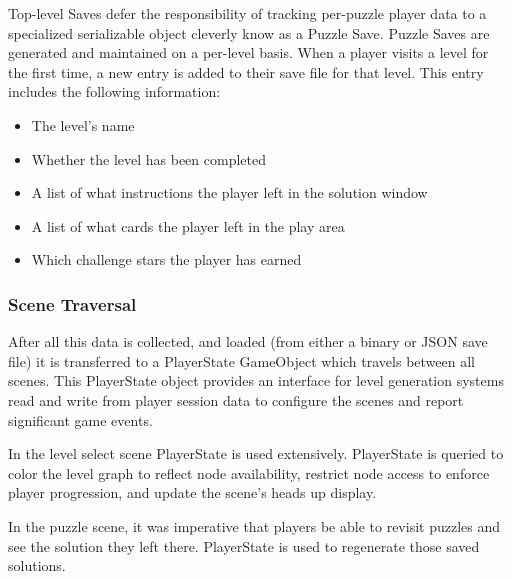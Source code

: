 Top-level Saves defer the responsibility of tracking per-puzzle player data to a specialized serializable object cleverly know as a Puzzle Save. Puzzle Saves are generated and maintained on a per-level basis. When a player visits a level for the first time, a new entry is added to their save file for that level. This entry includes the following information:
\begin{itemize}
    \item The level's name
    \item Whether the level has been completed
    \item A list of what instructions the player left in the solution window
    \item A list of what cards the player left in the play area
    \item Which challenge stars the player has earned
\end{itemize}

\subsubsection{Scene Traversal}
After all this data is collected, and loaded (from either a binary or JSON save file) it is transferred to a PlayerState GameObject which travels between all scenes. This PlayerState object provides an interface for level generation systems read and write from player session data to configure the scenes and report significant game events.

In the level select scene PlayerState is used extensively. PlayerState is queried to color the level graph to reflect node availability, restrict node access to enforce player progression, and update the scene's heads up display.

In the puzzle scene, it was imperative that players be able to revisit puzzles and see the solution they left there. PlayerState is used to regenerate those saved solutions.